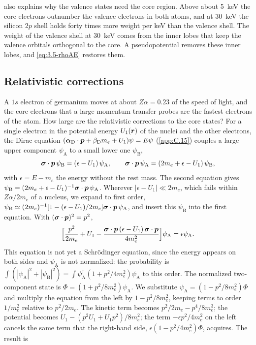  also explains why the valence states need the core region. Above about \SI{5}{keV} the core electrons outnumber the valence electrons in both atoms, and at \SI{30}{keV} the silicon $2p$ shell holds forty times more weight per keV than the valence shell. The weight of the valence shell at \SI{30}{keV} comes from the inner lobes that keep the valence orbitals orthogonal to the core. A pseudopotential removes these inner lobes, and \cref{eq:3.5-rhoAE} restores them.

\subsection{Relativistic corrections}

A $1s$ electron of germanium moves at about $Z\alpha = 0.23$ of the speed of light, and the core electrons that a large momentum transfer probes are the fastest electrons of the atom. How large are the relativistic corrections to the core states? For a single electron in the potential energy $U_1(\bm{r})$ of the nuclei and the other electrons, the Dirac equation $(\boldsymbol{\alpha}_{\mathrm{D}}\cdot\bm{p} + \beta_{\mathrm{D}}m_e + U_1)\psi = E\psi$ (\cref{app:C.15}) couples a large upper component $\psi_{\mathrm{A}}$ to a small lower one $\psi_{\mathrm{B}}$,
\begin{equation*}
  \boldsymbol{\sigma}\cdot\bm{p}\,\psi_{\mathrm{B}} = (\epsilon - U_1)\,\psi_{\mathrm{A}}, \qquad
  \boldsymbol{\sigma}\cdot\bm{p}\,\psi_{\mathrm{A}} = (2m_e + \epsilon - U_1)\,\psi_{\mathrm{B}} ,
\end{equation*}
with $\epsilon = E - m_e$ the energy without the rest mass. The second equation gives $\psi_{\mathrm{B}} = (2m_e + \epsilon - U_1)^{-1}\boldsymbol{\sigma}\cdot\bm{p}\,\psi_{\mathrm{A}}$. Wherever $|\epsilon - U_1| \ll 2m_e$, which fails within $Z\alpha/2m_e$ of a nucleus, we expand to first order, $\psi_{\mathrm{B}} \simeq (2m_e)^{-1}[1 - (\epsilon - U_1)/2m_e]\boldsymbol{\sigma}\cdot\bm{p}\,\psi_{\mathrm{A}}$, and insert this $\psi_{\mathrm{B}}$ into the first equation. With $(\boldsymbol{\sigma}\cdot\bm{p})^2 = p^2$,
\begin{equation*}
  \Bigl[\frac{p^2}{2m_e} + U_1 - \frac{\boldsymbol{\sigma}\cdot\bm{p}\,(\epsilon - U_1)\,\boldsymbol{\sigma}\cdot\bm{p}}{4m_e^2}\Bigr]\psi_{\mathrm{A}} = \epsilon\psi_{\mathrm{A}} .
\end{equation*}
This equation is not yet a Schr\"odinger equation, since the energy appears on both sides and $\psi_{\mathrm{A}}$ is not normalized: the probability is $\int(|\psi_{\mathrm{A}}|^2 + |\psi_{\mathrm{B}}|^2) = \int\psi_{\mathrm{A}}^\dagger(1 + p^2/4m_e^2)\psi_{\mathrm{A}}$ to this order. The normalized two-component state is $\Phi = (1 + p^2/8m_e^2)\psi_{\mathrm{A}}$. We substitute $\psi_{\mathrm{A}} = (1 - p^2/8m_e^2)\Phi$ and multiply the equation from the left by $1 - p^2/8m_e^2$, keeping terms to order $1/m_e^2$ relative to $p^2/2m_e$. The kinetic term becomes $p^2/2m_e - p^4/8m_e^3$; the potential becomes $U_1 - (p^2U_1 + U_1p^2)/8m_e^2$; the term $-\epsilon p^2/4m_e^2$ on the left cancels the same term that the right-hand side, $\epsilon(1 - p^2/4m_e^2)\Phi$, acquires. The result is
